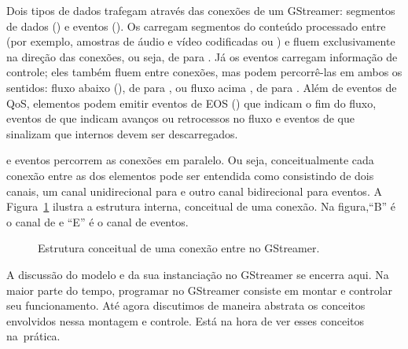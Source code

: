 \documentclass{SBCbookchapter}
\begin{document}
Dois tipos de dados trafegam através das conexões de um 
GStreamer: segmentos de dados () e eventos ().  Os
 carregam segmentos do conteúdo processado entre  (por
exemplo, amostras de áudio e vídeo codificadas ou ) e fluem
exclusivamente na direção das conexões, ou seja, de  para
.  Já os eventos carregam informação de controle; eles também
fluem entre conexões, mas podem percorrê-las em ambos os sentidos: fluxo
abaixo (), de  para , ou fluxo
acima , de  para .  Além de
eventos de QoS, elementos podem emitir eventos de EOS ()
que indicam o fim do fluxo, eventos de  que indicam avanços ou
retrocessos no fluxo e eventos de  que sinalizam que 
internos devem ser descarregados.

 e eventos percorrem as conexões em paralelo.  Ou seja,
conceitualmente cada conexão entre as  dos elementos pode ser
entendida como consistindo de dois canais, um canal unidirecional para
 e outro canal bidirecional para eventos.
A Figura~\ref{fig:conexao} ilustra a estrutura interna, conceitual de uma
conexão.  Na figura,``B'' é o canal de  e ``E'' é o canal de
eventos.

\begin{figure}[H]
  \centering
  \caption{Estrutura conceitual de uma conexão entre  no
    GStreamer.}
  \label{fig:conexao}
\end{figure}

A discussão do modelo  e da sua instanciação no GStreamer se
encerra aqui.  Na maior parte do tempo, programar no GStreamer consiste em
montar  e controlar seu funcionamento.  Até agora discutimos
de maneira abstrata os conceitos envolvidos nessa montagem e controle.  Está
na hora de ver esses conceitos na~prática.
\end{document}
